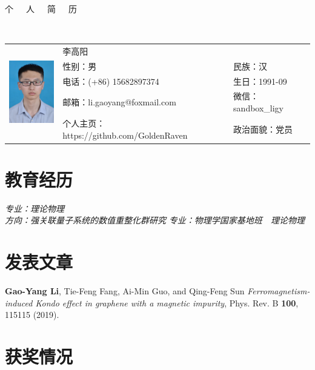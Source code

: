 \documentclass{resume}
\begin{document}

\begin{center}
\Huge{个~~~人~~~简~~~历}
\end{center}
\\
\Large{
  \begin{tabu}{ c l l }
    &
   \scshape{李高阳} &  \\
    & 性别：男 & 民族：汉 \\
    & 电话：(+86) 15682897374 & 生日：1991-09 \\
    & 邮箱：li.gaoyang@foxmail.com & 微信：sandbox\_ligy\\
    & 个人主页：https://github.com/GoldenRaven & 政治面貌：党员
  \end{tabu}
}

\section{教育经历}
\textit{专业：理论物理}\\
\textit{方向：强关联量子系统的数值重整化群研究}
\textit{专业：物理学国家基地班\ \ 理论物理}

\section{发表文章}
\textbf{Gao-Yang Li}, Tie-Feng Fang, Ai-Min Guo, and Qing-Feng Sun \textit{Ferromagnetism-induced Kondo effect in graphene with a magnetic impurity}, Phys. Rev. B \textbf{100}, 115115 (2019).

\section{获奖情况}
\end{document}
